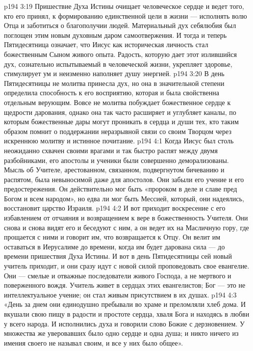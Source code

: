 \vs p194 3:19 Пришествие Духа Истины очищает человеческое сердце и ведет того, кто его принял, к формированию единственной цели в жизни --- исполнять волю Отца и заботиться о благополучии людей. Материальный дух себялюбия был поглощен этим новым духовным даром самоотвержения. И тогда и теперь Пятидесятница означает, что Иисус как историческая личность стал божественным Сыном живого опыта. Радость, которую дает этот излившийся дух, сознательно испытываемый в человеческой жизни, укрепляет здоровье, стимулирует ум и неизменно наполняет душу энергией.
\vs p194 3:20 \pc В день Пятидесятницы не молитва принесла дух, но она в значительной степени определила способность к его восприятию, которая и была свойственна отдельным верующим. Вовсе не молитва побуждает божественное сердце к щедрости дарования, однако она так часто расширяет и углубляет каналы, по которым божественные дары могут проникать в сердца и души тех, кто таким образом помнит о поддержании неразрывной связи со своим Творцом через искреннюю молитву и истинное почитание.
\vs p194 4:1 Когда Иисус был столь неожиданно схвачен своими врагами и так быстро распят между двумя разбойниками, его апостолы и ученики были совершенно деморализованы. Мысль об Учителе, арестованном, связанном, подвергнутом бичеванию и распятом, была невыносимой даже для апостолов. Они забыли его учение и его предостережения. Он действительно мог быть «пророком в деле и славе пред Богом и всем народом», но едва ли мог быть Мессией, который, они надеялись, восстановит царство Израиля.
\vs p194 4:2 И вот приходит воскресение с его избавлением от отчаяния и возвращением к вере в божественность Учителя. Они снова и снова видят его и беседуют с ним, а он ведет их на Масличную гору, где прощается с ними и говорит им, что возвращается к Отцу. Он велит им оставаться в Иерусалиме до времени, когда им будет дарована сила --- до времени пришествия Духа Истины. И вот в день Пятидесятницы сей новый учитель приходит, и они сразу идут с новой силой проповедовать свое евангелие. Они --- смелые и отважные последователи живого Господа, а не мертвого и поверженного вождя. Учитель живет в сердцах этих евангелистов; Бог --- это не интеллектуальное учение; он стал живым присутствием в их душах.
\vs p194 4:3 «День за днем они единодушно пребывали во храме и преломляли хлеб дома. И вкушали свою пищу в радости и простоте сердца, хваля Бога и находясь в любви у всего народа. И исполнились духа и говорили слово Божие с дерзновением. У множества же уверовавших было одно сердце и одна душа; и никто ничего из имения своего не называл своим, и все у них было общее».
